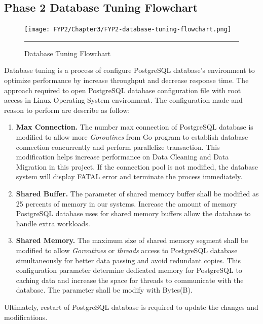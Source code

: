 \subsection{Phase 2 Database Tuning Flowchart}

\begin{figure}[H]
	\centering
	\texttt{[image: FYP2/Chapter3/FYP2-database-tuning-flowchart.png]}
	\rule{35em}{0.5pt}
	\caption[Database Tuning Flowchart]{Database Tuning Flowchart}
\end{figure} 

Database tuning is a process of configure PostgreSQL database's environment to optimize performance by increase throughput and decrease response time. The approach required to open PostgreSQL database configuration file with root access in Linux Operating System environment. The configuration made and reason to perform are describe as follow: 

\begin{enumerate}[topsep=0pt,itemsep=-1ex,partopsep=1ex,parsep=1.5ex]
	
	\item \textbf{Max Connection.} The number max connection of PostgreSQL database is modified to allow more \textit{Goroutines} from Go program to establish database connection concurrently and perform parallelize transaction. This modification helps increase performance on Data Cleaning and Data Migration in this project. If the connection pool is not modified, the database system will display FATAL error and terminate the process immediately. 
	\item \textbf{Shared Buffer.} The parameter of shared memory buffer shall be modified as 25 percents of memory in our systems. Increase the amount of memory PostgreSQL database uses for shared memory buffers allow the database to handle extra workloads. 
	\item \textbf{Shared Memory.} The maximum size of shared memory segment shall be modified to allow \textit{Goroutines} or \textit{threads} access to PostgreSQL database simultaneously for better data passing and avoid redundant copies. This configuration parameter determine dedicated memory for PostgreSQL to caching data and increase the space for threads to communicate with the database. The parameter shall be modify with Bytes(B). 
	
\end{enumerate}

Ultimately, restart of PostgreSQL database is required to update the changes and modifications. 

